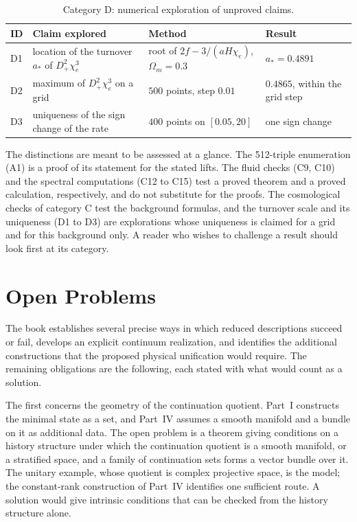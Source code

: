 \documentclass[11pt,oneside]{book}
\theoremstyle{definition}
\theoremstyle{remark}
\begin{document}
\begin{table}[h]
\centering
\scriptsize
\begin{tabular}{p{0.8cm}p{5.2cm}p{3.2cm}p{3.3cm}}
\hline
ID & Claim explored & Method & Result \\
\hline
D1 & location of the turnover $a_*$ of $D_+^2\chi_e^3$ & root of $2f-3/(aH\chi_e)$, $\Omega_m=0.3$ & $a_*=0.4891$ \\
D2 & maximum of $D_+^2\chi_e^3$ on a grid & $500$ points, step $0.01$ & $0.4865$, within the grid step \\
D3 & uniqueness of the sign change of the rate & $400$ points on $[0.05,20]$ & one sign change \\
\hline
\end{tabular}
\caption{Category D: numerical exploration of unproved claims.}
\end{table}

The distinctions are meant to be assessed at a glance. The 512-triple enumeration (A1) is a proof of its statement for the stated lifts. The fluid checks (C9, C10) and the spectral computations (C12 to C15) test a proved theorem and a proved calculation, respectively, and do not substitute for the proofs. The cosmological checks of category C test the background formulas, and the turnover scale and its uniqueness (D1 to D3) are explorations whose uniqueness is claimed for a grid and for this background only. A reader who wishes to challenge a result should look first at its category.

\chapter{Open Problems}\label{ch:open}

The book establishes several precise ways in which reduced descriptions succeed or fail, develops an explicit continuum realization, and identifies the additional constructions that the proposed physical unification would require. The remaining obligations are the following, each stated with what would count as a solution.

The first concerns the geometry of the continuation quotient. Part~I constructs the minimal state as a set, and Part~IV assumes a smooth manifold and a bundle on it as additional data. The open problem is a theorem giving conditions on a history structure under which the continuation quotient is a smooth manifold, or a stratified space, and a family of continuation sets forms a vector bundle over it. The unitary example, whose quotient is complex projective space, is the model; the constant-rank construction of Part~IV identifies one sufficient route. A solution would give intrinsic conditions that can be checked from the history structure alone.
\end{document}
